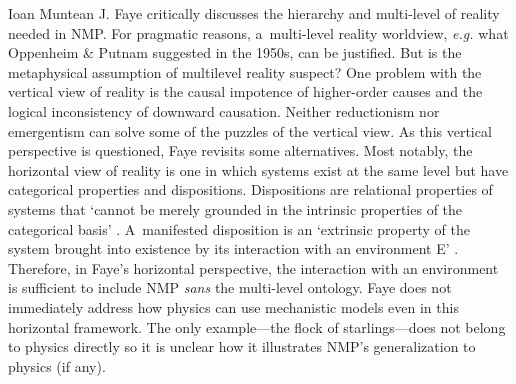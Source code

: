 \begin{recengenv}{Ioan Muntean}
J. Faye critically discusses the hierarchy and multi-level of reality needed in NMP. For pragmatic reasons, a~multi-level reality worldview, \textit{e.g.} what Oppenheim \& Putnam
\parencite*[][]{oppenheim_unity_1958} %
 suggested in the 1950s, can be justified. But is the metaphysical assumption of multilevel reality suspect? One problem with the vertical view of reality is the causal impotence of higher-order causes and the logical inconsistency of downward causation. Neither reductionism nor emergentism can solve some of the puzzles of the vertical view. As this vertical perspective is questioned, Faye revisits some alternatives. Most notably, the horizontal view of reality is one in which systems exist at the same level but have categorical properties and dispositions. Dispositions are relational properties of systems that ‘cannot be merely grounded in the intrinsic properties of the categorical basis' 
\parencite*[][p.177]{falkenburg_mechanistic_2019}. %
 A~manifested disposition is an ‘extrinsic property of the system brought into existence by its interaction with an environment E' 
\parencite*[][p.179]{falkenburg_mechanistic_2019}. %
 Therefore, in
 Faye's horizontal perspective, the interaction
 with an environment is sufficient  to include NMP \textit{sans} the multi-level ontology. Faye does not immediately address how physics can use mechanistic models even in this horizontal framework. The only example---the flock of starlings---does not belong to physics directly so it is unclear how it illustrates NMP's generalization to physics (if any).


\end{recengenv}
